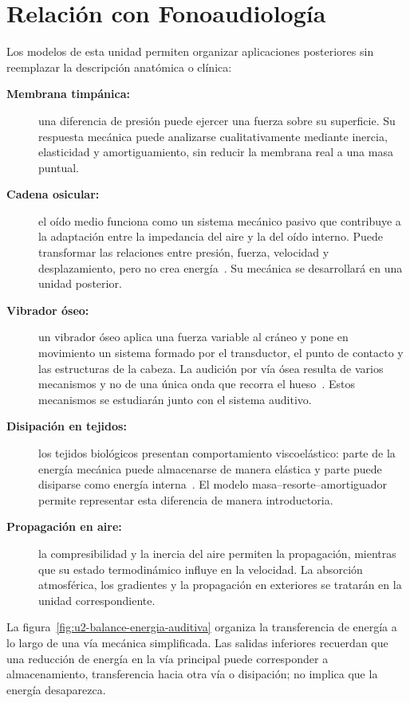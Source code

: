 \section{Relación con Fonoaudiología}
\label{sec:u2-fonoaudiologia}

Los modelos de esta unidad permiten organizar aplicaciones posteriores sin reemplazar la descripción anatómica o clínica:

\begin{description}
    \item[\textbf{Membrana timpánica:}] una diferencia de presión puede ejercer una fuerza sobre su superficie. Su respuesta mecánica puede analizarse cualitativamente mediante inercia, elasticidad y amortiguamiento, sin reducir la membrana real a una masa puntual.

    \item[\textbf{Cadena osicular:}] el oído medio funciona como un sistema mecánico pasivo que contribuye a la adaptación entre la impedancia del aire y la del oído interno. Puede transformar las relaciones entre presión, fuerza, velocidad y desplazamiento, pero no crea energía~\cite{ugarteburu2022}. Su mecánica se desarrollará en una unidad posterior.

    \item[\textbf{Vibrador óseo:}] un vibrador óseo aplica una fuerza variable al cráneo y pone en movimiento un sistema formado por el transductor, el punto de contacto y las estructuras de la cabeza. La audición por vía ósea resulta de varios mecanismos y no de una única onda que recorra el hueso~\cite{stenfeltGoode2005}. Estos mecanismos se estudiarán junto con el sistema auditivo.

    \item[\textbf{Disipación en tejidos:}] los tejidos biológicos presentan comportamiento viscoelástico: parte de la energía mecánica puede almacenarse de manera elástica y parte puede disiparse como energía interna~\cite{fung1981}. El modelo masa--resorte--amortiguador permite representar esta diferencia de manera introductoria.

    \item[\textbf{Propagación en aire:}] la compresibilidad y la inercia del aire permiten la propagación, mientras que su estado termodinámico influye en la velocidad. La absorción atmosférica, los gradientes y la propagación en exteriores se tratarán en la unidad correspondiente.
\end{description}

La figura~\ref{fig:u2-balance-energia-auditiva} organiza la transferencia de
energía a lo largo de una vía mecánica simplificada. Las salidas inferiores
recuerdan que una reducción de energía en la vía principal puede corresponder a
almacenamiento, transferencia hacia otra vía o disipación; no implica que la
energía desaparezca.

